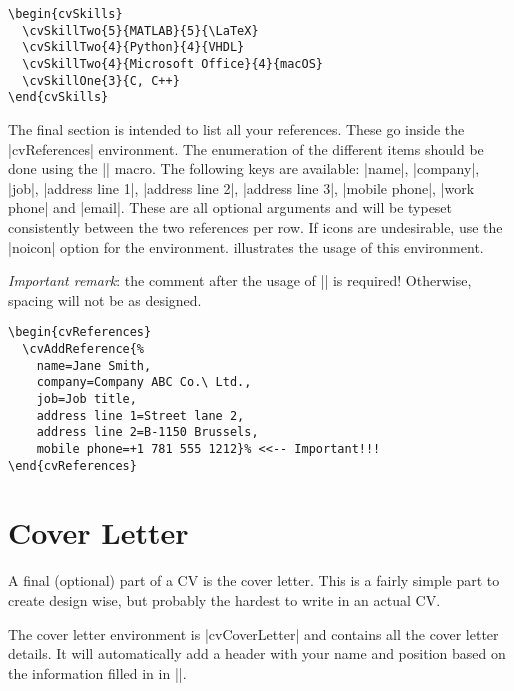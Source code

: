 \documentclass{ltxdoc}
\begin{document}
  \begin{lstlisting}[caption={Illustration of the \lstinline!cvSkills! environment.},label=cvSkills]
\begin{cvSkills}
  \cvSkillTwo{5}{MATLAB}{5}{\LaTeX}
  \cvSkillTwo{4}{Python}{4}{VHDL}
  \cvSkillTwo{4}{Microsoft Office}{4}{macOS}
  \cvSkillOne{3}{C, C++}
\end{cvSkills}
  \end{lstlisting}
  
  The final section is intended to list all your references. These go inside the |cvReferences| environment. The enumeration of the different items should be done using the \DescribeMacro{\cvAddReference} || macro. The following keys are available: |name|, |company|, |job|, |address line 1|, |address line 2|, |address line 3|, |mobile phone|, |work phone| and |email|. These are all optional arguments and will be typeset consistently between the two references per row. If icons are undesirable, use the |noicon| option for the environment.  illustrates the usage of this environment.
  
  \emph{Important remark}: the comment after the usage of |\cvAddReference| is required! Otherwise, spacing will not be as designed.
  
  \begin{lstlisting}[caption={\lstinline!cvReferences! code example.},label=cvReferences]
\begin{cvReferences}
  \cvAddReference{%
    name=Jane Smith,
    company=Company ABC Co.\ Ltd.,
    job=Job title,
    address line 1=Street lane 2,
    address line 2=B-1150 Brussels,
    mobile phone=+1 781 555 1212}% <<-- Important!!!
\end{cvReferences}
  \end{lstlisting}

\section{Cover Letter}

  A final (optional) part of a CV is the cover letter. This is a fairly simple part to create design wise, but probably the hardest to write in an actual CV. 

  The cover letter environment is |cvCoverLetter| and contains all the cover letter details. It will automatically add a header with your name and position based on the information filled in in |\cvID|. 
  
\end{document}
